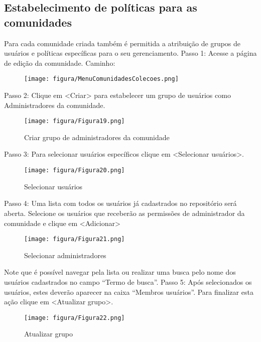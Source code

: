\documentclass[12pt,hidelinks]{article}
\begin{document}
\newpage
    \subsection{Estabelecimento de políticas para as comunidades}

    Para cada comunidade criada também é permitida a atribuição de grupos de usuários e políticas específicas para o seu gerenciamento.
    \singlespacing
    Passo 1: Acesse a página de edição da comunidade. Caminho:
    
    \begin{figure}[!htp]
                \centering
                \texttt{[image: figura/MenuComunidadesColecoes.png]}
            \label{Rotulo}
        \end{figure}
    
    Passo 2: Clique em <Criar> para estabelecer um grupo de usuários como Administradores da comunidade.
    
    \begin{figure}[!htp]
                \centering
                \texttt{[image: figura/Figura19.png]}
                \caption{Criar grupo de administradores da comunidade}
            \label{Rotulo}
        \end{figure}
    
    Passo 3: Para selecionar usuários específicos clique em <Selecionar usuários>.
    
    \begin{figure}[!htp]
                \centering
                \texttt{[image: figura/Figura20.png]}
                \caption{Selecionar usuários}
            \label{Rotulo}
        \end{figure}
        
\newpage

    Passo 4: Uma lista com todos os usuários já cadastrados no repositório será aberta. Selecione os
    usuários que receberão as permissões de administrador da comunidade e clique em <Adicionar>
    
    \begin{figure}[!htp]
                \centering
                \texttt{[image: figura/Figura21.png]}
                \caption{Selecionar administradores}
            \label{Rotulo}
        \end{figure}
    
    \singlespacing
    Note que é possível navegar pela lista ou realizar uma busca pelo nome dos usuários cadastrados no campo “Termo de busca”.
    \singlespacing
    Passo 5: Após selecionados os usuários, estes deverão aparecer na caixa “Membros usuários”. Para finalizar esta ação clique em <Atualizar grupo>.
    \singlespacing
    \begin{figure}[!htp]
                \centering
                \texttt{[image: figura/Figura22.png]}
                \caption{Atualizar grupo}
            \label{Rotulo}
        \end{figure}
\end{document}
